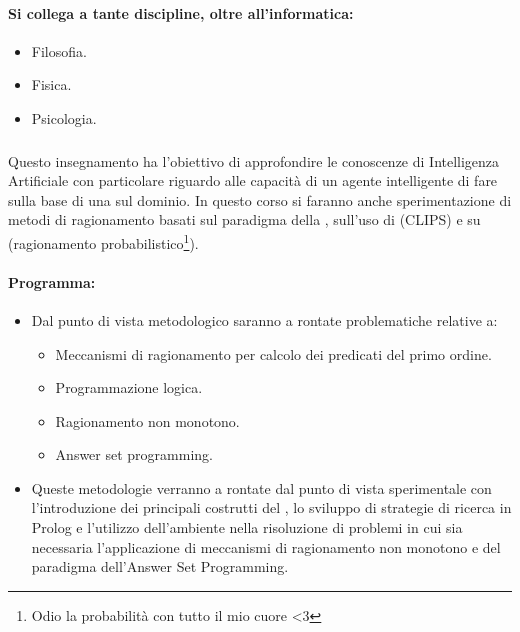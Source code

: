 \paragraph{Si collega a tante discipline, oltre all'informatica:}

\begin{itemize}
  \item Filosofia. 
  \item Fisica. 
  \item Psicologia.
\end{itemize}

\subsubsection{}

Questo insegnamento ha l’obiettivo di approfondire le
conoscenze di Intelligenza Artificiale con particolare riguardo
alle capacità di un agente intelligente di fare  sulla
base di una  sul dominio. In questo corso si faranno anche sperimentazione di metodi di ragionamento basati sul
paradigma della , sull’uso di
 (CLIPS) e su  (ragionamento probabilistico\footnote{Odio la probabilità con tutto il mio cuore <3}).

\paragraph{Programma:}

\begin{itemize}
  \item Dal punto di vista metodologico saranno a rontate problematiche relative a: 
    \begin{itemize}
      \item Meccanismi di ragionamento per calcolo dei predicati del primo
ordine. 
\item Programmazione logica.
\item Ragionamento non monotono. 
\item Answer set programming.
    \end{itemize}
  \item Queste metodologie verranno a rontate dal punto di vista sperimentale con
    l’introduzione dei principali costrutti del , lo sviluppo di strategie di
ricerca in Prolog e l’utilizzo dell’ambiente  nella risoluzione di
problemi in cui sia necessaria l’applicazione di meccanismi di ragionamento
non monotono e del paradigma dell’Answer Set Programming.
\end{itemize}


